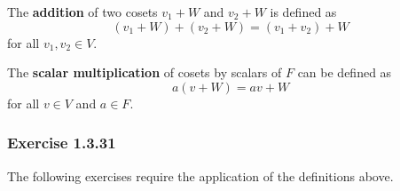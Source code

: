 \begin{definition}
    The \textbf{addition} of two cosets \( v_{1}  + W  \) and \( v_{2} + W  \) is defined as 
    \[ (v_{1} + W) + (v_{2} + W) = (v_{1} + v_{2}) + W  \]
    for all \( v_{1}, v_{2} \in V  \).
\end{definition}

\begin{definition}
    The \textbf{scalar multiplication} of cosets by scalars of \( F  \) can be defined as 
    \[  a ( v + W ) = av + W \]
    for all \( v \in V  \) and \( a \in F  \).
\end{definition}


\subsubsection{Exercise 1.3.31} The following exercises require the application of the definitions above.
